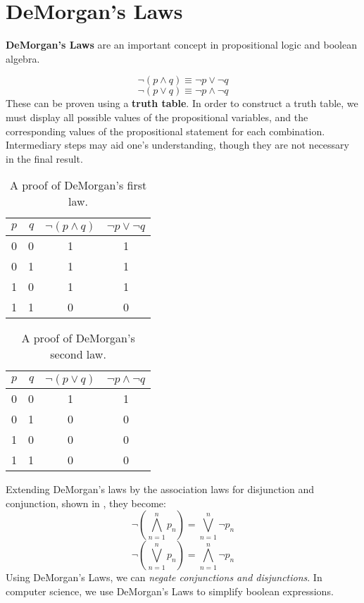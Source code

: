 \section{DeMorgan's Laws}
\textbf{DeMorgan's Laws} are an important concept in propositional logic and boolean algebra.

\begin{equation}
  \neg (p \land q) \equiv \neg p \lor \neg q
\end{equation}
\begin{equation}
  \neg(p \lor q) \equiv \neg p \land \neg q
\end{equation}
These can be proven using a \textbf{truth table}.
In order to construct a truth table, we must display all possible values of the propositional variables,
and the corresponding values of the propositional statement for each combination.
Intermediary steps may aid one's understanding, though they are not necessary in the final result.
\begin{table}[H]
  \centering
    \begin{tabular}{lrcc}
      \toprule
      $p$ & $q$ & $\neg(p \land q)$ & $\neg p \lor \neg q$ \\ \midrule
      0 & 0 & 1 & 1 \\
      0 & 1 & 1 & 1\\
      1 & 0 & 1 & 1\\
      1 & 1 & 0 & 0\\
      \bottomrule
    \end{tabular}
  \caption{A proof of DeMorgan's first law.}
\end{table}

\begin{table}[H]
  \centering
    \begin{tabular}{lrcc}
      \toprule
      $p$ & $q$ & $\neg(p \lor q)$ & $\neg p \land \neg q$ \\ \midrule
      0 & 0 & 1 & 1 \\
      0 & 1 & 0 & 0 \\
      1 & 0 & 0 & 0 \\
      1 & 1 & 0 & 0 \\
      \bottomrule
    \end{tabular}
  \caption{A proof of DeMorgan's second law.}
\end{table}

Extending DeMorgan's laws by the association laws for disjunction and conjunction, shown in , they become:
\begin{equation}
 \neg\left(\bigwedge^n_{n=1} p_n\right)=\bigvee^n_{n=1} \neg p_n
\end{equation}
\begin{equation}
 \neg\left(\bigvee^n_{n=1} p_n\right)=\bigwedge^n_{n=1} \neg p_n
\end{equation}
Using DeMorgan's Laws, we can \emph{negate conjunctions and disjunctions}.
In computer science, we use DeMorgan's Laws to simplify boolean expressions.

